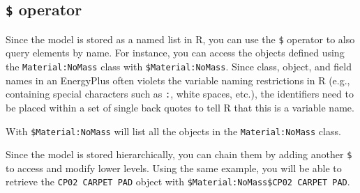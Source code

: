 \documentclass[
]{book}
\newenvironment{Shaded}{\begin{snugshade}}{\end{snugshade}}
\newcommand{\AttributeTok}[1]{\textcolor[rgb]{0.77,0.63,0.00}{#1}}
\newcommand{\DocumentationTok}[1]{\textcolor[rgb]{0.56,0.35,0.01}{\textbf{\textit{#1}}}}
\newcommand{\NormalTok}[1]{#1}
\newcommand{\SpecialCharTok}[1]{\textcolor[rgb]{0.00,0.00,0.00}{#1}}
\newcommand{\StringTok}[1]{\textcolor[rgb]{0.31,0.60,0.02}{#1}}
\begin{document}
\hypertarget{operator}{%
\subsection{\texorpdfstring{\texttt{\$} operator}{\$ operator}}\label{operator}}

Since the model is stored as a named list in R, you can use the \texttt{\$} operator to also query elements by name. For instance, you can access the objects defined using the \texttt{Material:NoMass} class with \texttt{\$Material:NoMass}. Since class, object, and field names in an EnergyPlus often violets the variable naming restrictions in R (e.g., containing special characters such as \texttt{:}, white spaces, etc.), the identifiers need to be placed within a set of single back quotes \texttt{\textasciigrave{}} to tell R that this is a variable name.

With \texttt{\$\textasciigrave{}Material:NoMass\textasciigrave{}} will list all the objects in the \texttt{Material:NoMass} class.

\begin{Shaded}
\end{Shaded}

Since the model is stored hierarchically, you can chain them by adding another \texttt{\$} to access and modify lower levels. Using the same example, you will be able to retrieve the \texttt{CP02\ CARPET\ PAD} object with \texttt{\$\textasciigrave{}Material:NoMass\textasciigrave{}\$\textasciigrave{}CP02\ CARPET\ PAD\textasciigrave{}}.
\end{document}
